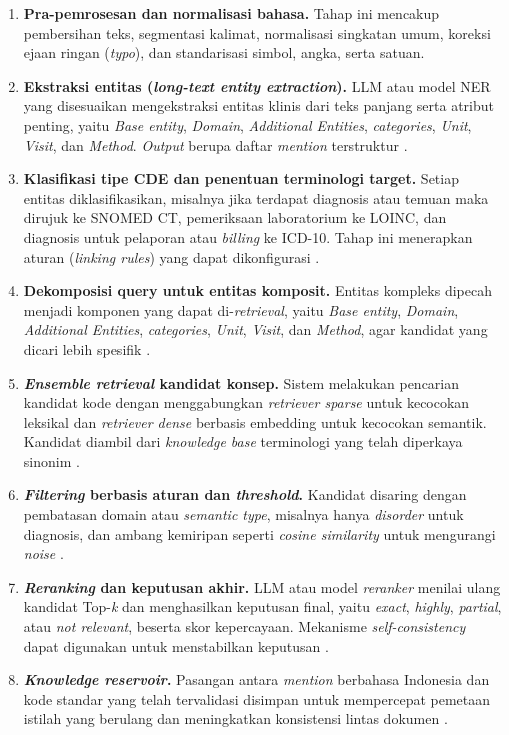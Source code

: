 \begin{enumerate}
    \item \textbf{Pra-pemrosesan dan normalisasi bahasa.} Tahap ini mencakup pembersihan teks, segmentasi kalimat, normalisasi singkatan umum, koreksi ejaan ringan (\textit{typo}), dan standarisasi simbol, angka, serta satuan.
    \item \textbf{Ekstraksi entitas (\textit{long-text entity extraction}).} LLM atau model NER yang disesuaikan mengekstraksi entitas klinis dari teks panjang serta atribut penting, yaitu \textit{Base entity}, \textit{Domain}, \textit{Additional Entities}, \textit{categories}, \textit{Unit}, \textit{Visit}, dan \textit{Method}. \textit{Output} berupa daftar \textit{mention} terstruktur \citep{purwitasari_comparison_2023}.
    \item \textbf{Klasifikasi tipe CDE dan penentuan terminologi target.} Setiap entitas diklasifikasikan, misalnya jika terdapat diagnosis atau temuan maka dirujuk ke SNOMED CT, pemeriksaan laboratorium ke LOINC, dan diagnosis untuk pelaporan atau \textit{billing} ke ICD-10. Tahap ini menerapkan aturan (\textit{linking rules}) yang dapat dikonfigurasi \citep{ayuningtyas_bringing_2025}.
    \item \textbf{Dekomposisi query untuk entitas komposit.} Entitas kompleks dipecah menjadi komponen yang dapat di-\textit{retrieval}, yaitu \textit{Base entity}, \textit{Domain}, \textit{Additional Entities}, \textit{categories}, \textit{Unit}, \textit{Visit}, dan \textit{Method}, agar kandidat yang dicari lebih spesifik \citep{gilani_cde-mapper_2025}.
    \item \textbf{\textit{Ensemble retrieval} kandidat konsep.} Sistem melakukan pencarian kandidat kode dengan menggabungkan \textit{retriever sparse} untuk kecocokan leksikal dan \textit{retriever dense} berbasis embedding untuk kecocokan semantik. Kandidat diambil dari \textit{knowledge base} terminologi yang telah diperkaya sinonim \citep{gilani_cde-mapper_2025}.
    \item \textbf{\textit{Filtering} berbasis aturan dan \textit{threshold}.} Kandidat disaring dengan pembatasan domain atau \textit{semantic type}, misalnya hanya \textit{disorder} untuk diagnosis, dan ambang kemiripan seperti \textit{cosine similarity} untuk mengurangi \textit{noise} \citep{chen_clinical_2020}.
    \item \textbf{\textit{Reranking} dan keputusan akhir.} LLM atau model \textit{reranker} menilai ulang kandidat Top-\textit{k} dan menghasilkan keputusan final, yaitu \textit{exact}, \textit{highly}, \textit{partial}, atau \textit{not relevant}, beserta skor kepercayaan. Mekanisme \textit{self-consistency} dapat digunakan untuk menstabilkan keputusan \citep{gilani_cde-mapper_2025}.
    \item \textbf{\textit{Knowledge reservoir}.} Pasangan antara \textit{mention} berbahasa Indonesia dan kode standar yang telah tervalidasi disimpan untuk mempercepat pemetaan istilah yang berulang dan meningkatkan konsistensi lintas dokumen \citep{gilani_cde-mapper_2025}.
\end{enumerate}

